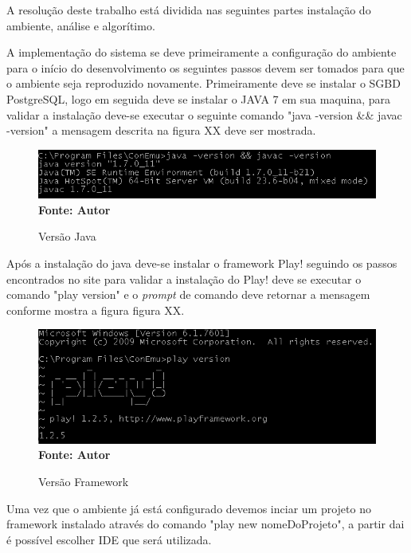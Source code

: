 

\iniciocapitulo
A resolução deste trabalho está dividida nas seguintes partes instalação do ambiente, análise e algorítimo.\par

A implementação do sistema se deve primeiramente a configuração do ambiente para o início do desenvolvimento os seguintes passos devem ser tomados para que o ambiente seja reproduzido novamente. Primeiramente deve se instalar o SGBD PostgreSQL, logo em seguida deve se instalar o JAVA 7 em sua maquina, para validar a instalação deve-se executar o seguinte comando "java -version && javac -version" a mensagem descrita na figura XX deve ser mostrada.

\begin{figure}[!htb]
\caption[Versão Java]{Versão Java}
\label{fig:figura2}
\centering
\includegraphics[scale=0.8]{imagens/mensagemJava.png}
\\ \textbf{\footnotesize Fonte: Autor}
\end{figure}


Após a instalação do java deve-se instalar o framework Play! seguindo os passos encontrados no site \cite{play} para validar a instalação do Play! deve se executar o comando "play version" e o \textit{prompt} de comando deve retornar a mensagem conforme mostra a figura figura XX.

\begin{figure}[!htb]
\caption[Versão Framework]{Versão Framework}
\label{fig:figura2}
\centering
\includegraphics[scale=0.8]{imagens/mensagemPlay.png}
\\ \textbf{\footnotesize Fonte: Autor}
\end{figure}

Uma vez que o ambiente já está configurado devemos inciar um projeto no framework instalado através do comando "play new nomeDoProjeto", a partir dai é possível escolher IDE que será utilizada.

